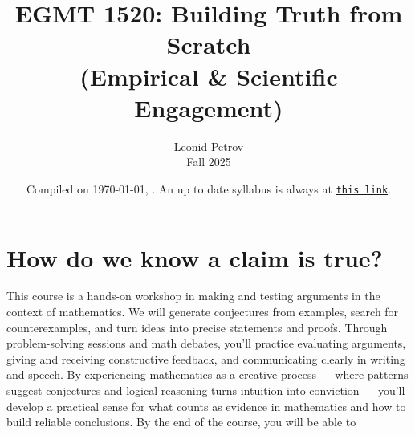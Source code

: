 \documentclass[oneside,11pt]{amsart}
\begin{document}
\title[Building Truth from Scratch]{EGMT 1520: Building Truth from Scratch\\(Empirical \& Scientific Engagement)}
\author{Leonid Petrov\\Fall 2025}
\date{Compiled on \today, \currenttime. An up to date syllabus is always at \href{https://github.com/lenis2000/Syllabi/blob/master/Syllabus_EGMT_f25.pdf}{\texttt{this link}}.}
\maketitle


\section{How do we know a claim is true?}

This course is a hands-on workshop in making and testing arguments in the context of mathematics.
We will generate conjectures from examples, search for counterexamples, and turn ideas into precise statements and proofs. Through problem-solving sessions and math debates, you'll practice evaluating arguments, giving and receiving constructive feedback, and communicating clearly in writing and speech. By experiencing mathematics as a creative process --- where patterns suggest conjectures and logical reasoning turns intuition into conviction --- you'll develop a practical sense for what counts as evidence in mathematics and how to build reliable conclusions.
By the end of the course, you will be able to
\end{document}
